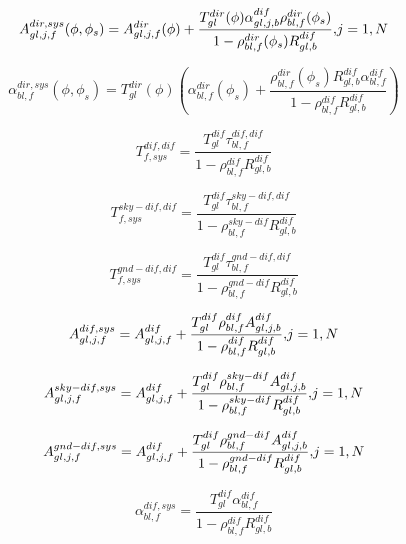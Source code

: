 \begin{equation}
A_{gl,j,f}^{dir,sys}(\phi ,{\phi_s}) = A_{gl,j,f}^{dir}(\phi ) + \frac{{T_{gl}^{dir}(\phi )\alpha_{gl,j,b}^{dif}\rho_{bl,f}^{dir}({\phi_s})}}{{1 - \rho_{bl,f}^{dir}({\phi_s})R_{gl,b}^{dif}}}{\rm{,    }}j = 1,N
\end{equation}

\begin{equation}
\alpha_{bl,f}^{dir,sys}(\phi ,{\phi_s}) = T_{gl}^{dir}(\phi )\left( {\alpha_{bl,f}^{dir}({\phi_s}) + \frac{{\rho_{bl,f}^{dir}({\phi_s})R_{gl,b}^{dif}\alpha_{bl,f}^{dif}}}{{1 - \rho_{bl,f}^{dif}R_{gl,b}^{dif}}}} \right)
\end{equation}

\begin{equation}
T_{f,sys}^{dif,dif} = \frac{{T_{gl}^{dif}\tau_{bl,f}^{dif,dif}}}{{1 - \rho_{bl,f}^{dif}R_{gl,b}^{dif}}}
\end{equation}

\begin{equation}
T_{f,sys}^{sky - dif,dif} = \frac{{T_{gl}^{dif}\tau_{bl,f}^{sky - dif,dif}}}{{1 - \rho_{bl,f}^{sky - dif}R_{gl,b}^{dif}}}
\end{equation}

\begin{equation}
T_{f,sys}^{gnd - dif,dif} = \frac{{T_{gl}^{dif}\tau_{bl,f}^{gnd - dif,dif}}}{{1 - \rho_{bl,f}^{gnd - dif}R_{gl,b}^{dif}}}
\end{equation}

\begin{equation}
A_{gl,j,f}^{dif,sys} = A_{gl,j,f}^{dif} + \frac{{T_{gl}^{dif}\rho_{bl,f}^{dif}A_{gl,j,b}^{dif}}}{{1 - \rho_{bl,f}^{dif}R_{gl,b}^{dif}}}{\rm{,    }}j = 1,N
\end{equation}

\begin{equation}
A_{gl,j,f}^{sky - dif,sys} = A_{gl,j,f}^{dif} + \frac{{T_{gl}^{dif}\rho_{bl,f}^{sky - dif}A_{gl,j,b}^{dif}}}{{1 - \rho_{bl,f}^{sky - dif}R_{gl,b}^{dif}}}{\rm{,    }}j = 1,N
\end{equation}

\begin{equation}
A_{gl,j,f}^{gnd - dif,sys} = A_{gl,j,f}^{dif} + \frac{{T_{gl}^{dif}\rho_{bl,f}^{gnd - dif}A_{gl,j,b}^{dif}}}{{1 - \rho_{bl,f}^{gnd - dif}R_{gl,b}^{dif}}}{\rm{,    }}j = 1,N
\end{equation}

\begin{equation}
\alpha_{bl,f}^{dif,sys} = \frac{{T_{gl}^{dif}\alpha_{bl,f}^{dif}}}{{1 - \rho_{bl,f}^{dif}R_{gl,b}^{dif}}}
\end{equation}

